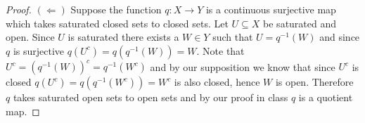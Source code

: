 \documentclass[minion]{homework651}
\begin{document}
\begin{problems}
\begin{proof}$(\Leftarrow)$ Suppose the function $q: X \to Y$ is a continuous surjective map which takes saturated closed sets to closed sets.
    Let $U \subseteq X$ be saturated and open. Since $U$ is saturated there exists a $W \in Y$ such that $U = q^{-1}(W)$ and since $q$ is surjective $q(U^c) = q(q^{-1}(W)) = W$. Note that 
    $U^c = (q^{-1}(W))^c = q^{-1}(W^c)$ and by our supposition we know that since $U^c$ is closed $q(U^c) = q(q^{-1}(W^c)) = W^c$ is also closed, hence $W$ is open. Therefore $q$ takes saturated open sets to open sets and by our proof in class $q$ is a quotient map. 
\end{proof}
  
\end{problems}
\end{document}
